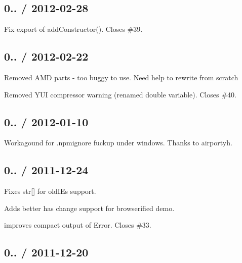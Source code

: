 \subsection*{0.. / 2012-\/02-\/28 }


\begin{DoxyItemize}
\item Fix export of {\ttfamily add\+Constructor()}. Closes \#39.
\end{DoxyItemize}

\subsection*{0.. / 2012-\/02-\/22 }


\begin{DoxyItemize}
\item Removed A\+MD parts -\/ too buggy to use. Need help to rewrite from scratch
\item Removed Y\+UI compressor warning (renamed {\ttfamily double} variable). Closes \#40.
\end{DoxyItemize}

\subsection*{0.. / 2012-\/01-\/10 }


\begin{DoxyItemize}
\item Workagound for .npmignore fuckup under windows. Thanks to airportyh.
\end{DoxyItemize}

\subsection*{0.. / 2011-\/12-\/24 }


\begin{DoxyItemize}
\item Fixes str\mbox{[}\mbox{]} for old\+I\+Es support.
\item Adds better has change support for browserified demo.
\item improves compact output of Error. Closes \#33.
\end{DoxyItemize}

\subsection*{0.. / 2011-\/12-\/20 }



